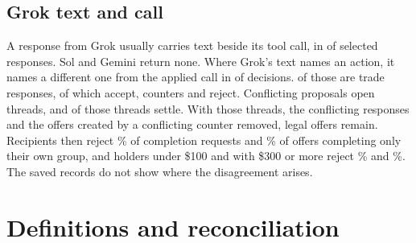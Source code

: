 \subsection{Grok text and call}

A response from Grok usually carries text beside its tool call, in  of  selected responses. Sol and Gemini return none. Where Grok's text names an action, it names a different one from the applied call in  of  decisions.  of those are trade responses, of which  accept,  counters and  reject. Conflicting proposals open  threads, and  of those threads settle. With those threads, the conflicting responses and the offers created by a conflicting counter removed,  legal offers remain. Recipients then reject \% of completion requests and \% of offers completing only their own group, and holders under \$100 and with \$300 or more reject \% and \%. The saved records do not show where the disagreement arises.

\section{Definitions and reconciliation}
\label{app:definitions}

